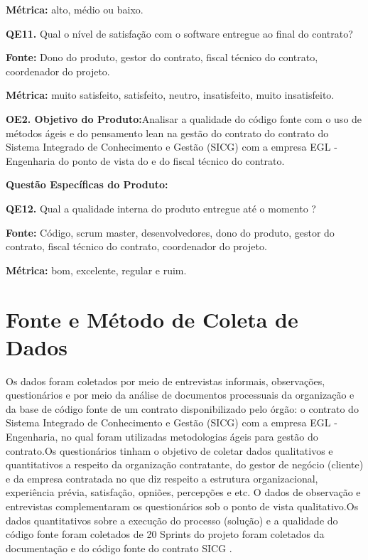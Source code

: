 \textbf{Métrica:} alto, médio ou baixo. 
 
 \vspace{\onelineskip} 

\textbf{QE11.} Qual o nível de satisfação com o software entregue ao final do contrato?

\textbf{Fonte:} Dono do produto, gestor do contrato, fiscal técnico do contrato, coordenador do projeto.

\textbf{Métrica:} muito satisfeito, satisfeito, neutro, insatisfeito, muito insatisfeito.
 
 \vspace{\onelineskip} 

\textbf{OE2. Objetivo do Produto:}Analisar a qualidade do código fonte com o uso de métodos ágeis e do pensamento lean na gestão do contrato do contrato do Sistema Integrado 
de Conhecimento e Gestão (SICG) com a empresa EGL - Engenharia do ponto de vista do  e do fiscal técnico do contrato.

\textbf{Questão Específicas do Produto:}

\textbf{QE12.} Qual a qualidade interna do produto entregue até o momento ?

\textbf{Fonte:} Código, scrum master, desenvolvedores, dono do produto, gestor do contrato, fiscal técnico do contrato, coordenador do projeto.

\textbf{Métrica:} bom, excelente, regular e ruim.


\section[Fonte e Método Coleta de Dados]{Fonte e Método de Coleta de Dados}

Os dados foram coletados por meio de entrevistas informais, observações, questionários e por meio da análise de documentos processuais da organização e da base de código fonte de um contrato disponibilizado pelo órgão: o contrato do Sistema Integrado de Conhecimento e Gestão (SICG) com a empresa EGL - Engenharia, no qual foram utilizadas metodologias ágeis para gestão do contrato.Os questionários tinham o objetivo de coletar dados qualitativos e
quantitativos a respeito da organização contratante, do gestor de negócio (cliente) e da empresa contratada no que diz respeito a estrutura organizacional, experiência prévia, satisfação, opniões, percepções e etc. O dados de observação e entrevistas
complementaram os questionários sob o ponto de vista qualitativo.Os dados quantitativos
sobre a execução do processo (solução) e a qualidade do código fonte foram coletados de 20 Sprints do projeto foram coletados da documentação e do código fonte do contrato SICG .

